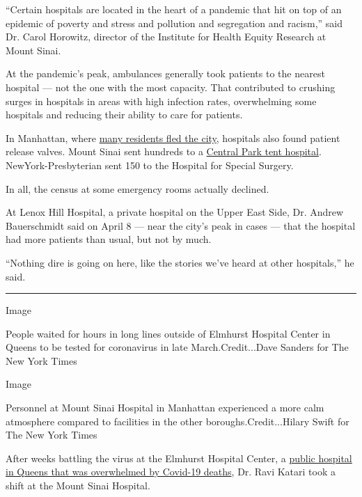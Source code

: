 ``Certain hospitals are located in the heart of a pandemic that hit on
top of an epidemic of poverty and stress and pollution and segregation
and racism,'' said Dr. Carol Horowitz, director of the Institute for
Health Equity Research at Mount Sinai.

At the pandemic's peak, ambulances generally took patients to the
nearest hospital --- not the one with the most capacity. That
contributed to crushing surges in hospitals in areas with high infection
rates, overwhelming some hospitals and reducing their ability to care
for patients.

In Manhattan, where
\href{https://www.nytimes3xbfgragh.onion/interactive/2020/05/15/upshot/who-left-new-york-coronavirus.html}{many
residents fled the city}, hospitals also found patient release valves.
Mount Sinai sent hundreds to a
\href{https://www.nytimes3xbfgragh.onion/2020/04/15/nyregion/coronavirus-central-park-hospital-tent.html}{Central
Park tent hospital}. NewYork-Presbyterian sent 150 to the Hospital for
Special Surgery.

In all, the census at some emergency rooms actually declined.

At Lenox Hill Hospital, a private hospital on the Upper East Side, Dr.
Andrew Bauerschmidt said on April 8 --- near the city's peak in cases
--- that the hospital had more patients than usual, but not by much.

``Nothing dire is going on here, like the stories we've heard at other
hospitals,'' he said.

\begin{center}\rule{0.5\linewidth}{\linethickness}\end{center}

Image

People waited for hours in long lines outside of Elmhurst Hospital
Center in Queens to be tested for coronavirus in late
March.Credit...Dave Sanders for The New York Times

Image

Personnel at Mount Sinai Hospital in Manhattan experienced a more calm
atmosphere compared to facilities in the other boroughs.Credit...Hilary
Swift for The New York Times

After weeks battling the virus at the Elmhurst Hospital Center, a
\href{https://www.nytimes3xbfgragh.onion/2020/03/25/nyregion/nyc-coronavirus-hospitals.html}{public
hospital in Queens that was overwhelmed by Covid-19 deaths}, Dr. Ravi
Katari took a shift at the Mount Sinai Hospital.

